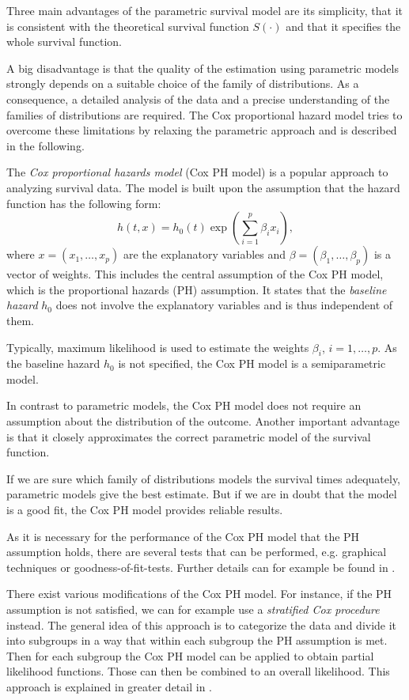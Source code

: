 \documentclass[12pt, a4paper]{scrartcl}
\theoremstyle{definition}
\theoremstyle{plain}
\numberwithin{equation}{section}
\numberwithin{figure}{section}
\numberwithin{table}{section}
\begin{document}
	Three main advantages of the parametric survival model are its simplicity,  that it is consistent with the theoretical survival function $S(\cdot)$ and that it specifies the whole survival function.
	
	A big disadvantage is that the quality of the estimation using parametric models strongly depends on a suitable choice of the family of distributions.
	As a consequence, a detailed analysis of the data and a precise understanding of the families of distributions are required.
	The Cox proportional hazard model tries to overcome these limitations by relaxing the parametric approach and is described in the following.
	
	The \emph{Cox proportional hazards model} (Cox PH model) is a popular approach to analyzing survival data.
	The model is built upon the assumption that the hazard function has the following form:
	\begin{equation*}
	h(t,x) = h_0(t) \exp \left(\sum_{i=1}^p \beta_i x_i\right),
	\end{equation*}
	where $x=(x_1,\dots,x_p)$ are the explanatory variables and $\beta = (\beta_1,\dots, \beta_p)$ is a vector of weights.
	This includes the central assumption of the Cox PH model, which is the proportional hazards (PH) assumption.
	It states that the \emph{baseline hazard} $h_0$ does not involve the explanatory variables and is thus independent of them.

	Typically, maximum likelihood is used to estimate the weights $\beta_i$, $i=1,\dots ,p$.
	As the baseline hazard $h_0$ is not specified, the Cox PH model is a semiparametric model.
	
	In contrast to parametric models, the Cox PH model does not require an assumption about the distribution of the outcome.
	Another important advantage is that it closely approximates the correct parametric model of the survival function.
	
	If we are sure which family of distributions models the survival times adequately, parametric models give the best estimate.
	But if we are in doubt that the model is a good fit, the Cox PH model provides reliable results.
	
	As it is necessary for the performance of the Cox PH model that the PH assumption holds, there are several tests that can be performed, e.g. graphical techniques or goodness-of-fit-tests.
	Further details can for example be found in \citet*[Chapter~3]{sabook}.
	
	There exist various modifications of the Cox PH model.
	For instance, if the PH assumption is not satisfied, we can for example use a \emph{stratified Cox procedure} instead.
	The general idea of this approach is to categorize the data and divide it into subgroups in a way that within each subgroup the PH assumption is met.
	Then for each subgroup the Cox PH model can be applied to obtain partial likelihood functions.
	Those can then be combined to an overall likelihood.
	This approach is explained in greater detail in \citet*[Chapter~5]{sabook}.
\end{document}
